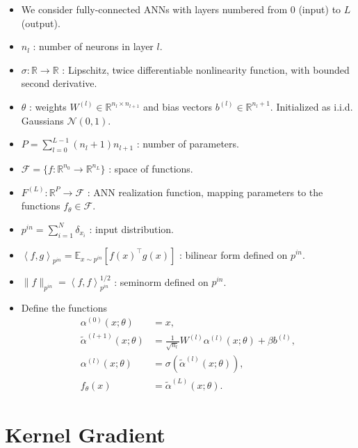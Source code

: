 \documentclass[10pt]{article}
\newcommand{\RR}{\mathbb{R}}
\newcommand{\EE}{\mathbb{E}}
\newcommand{\FF}{\mathcal{F}}
\newcommand{\NN}{\mathcal{N}}
\newcommand{\inner}[2]{\left\langle #1, #2 \right\rangle}
\newcommand{\paran}[1]{{( #1 )}}
\newcommand{\pin}{{p^{in}}}
\begin{document}
\begin{itemize}
\item We consider fully-connected ANNs with layers numbered from $0$ (input) to $L$ (output).
\item $n_l$ : number of neurons in layer $l$.
\item $\sigma : \RR \rightarrow \RR$ : Lipschitz, twice differentiable nonlinearity function, with bounded second derivative.
\item $\theta$ : weights $W^\paran{l} \in \RR^{n_l \times n_{l + 1}}$ and bias vectors $b^\paran{l} \in \RR^{n_l + 1}$. Initialized as i.i.d. Gaussians $\NN(0,1)$.
\item $P = \sum_{l = 0}^{L - 1} (n_l + 1) n_{l + 1}$ : number of parameters.
\item $\FF = \{f : \RR^{n_0} \rightarrow \RR^{n_L}\}$ : space of functions.
\item $F^\paran{L} : \RR^P \rightarrow \FF$ : ANN realization function, mapping parameters to the functions $f_\theta \in \FF$.
\item $\pin = \sum_{i = 1}^N \delta_{x_i}$ : input distribution.
\item $\inner{f}{g}_{\pin} = \EE_{x \sim \pin} [f(x)^\top g(x)]$ : bilinear form defined on $\pin$.
\item $\| f \|_{\pin} = \inner{f}{f}_{\pin}^{1/2}$ : seminorm defined on $\pin$.
\item Define the functions
\begin{align*}
\alpha^\paran{0}(x;\theta) &= x, \\
\tilde{\alpha}^\paran{l + 1}(x;\theta) &= \frac{1}{\sqrt{n_l}} W^\paran{l} \alpha^\paran{l}(x;\theta) + \beta b^\paran{l}, \\
\alpha^\paran{l}(x;\theta) &= \sigma(\tilde{\alpha}^\paran{l}(x;\theta)), \\
f_\theta(x) &= \tilde{\alpha}^\paran{L}(x;\theta).
\end{align*}
\end{itemize}

\newpage

\section{Kernel Gradient}
\end{document}
